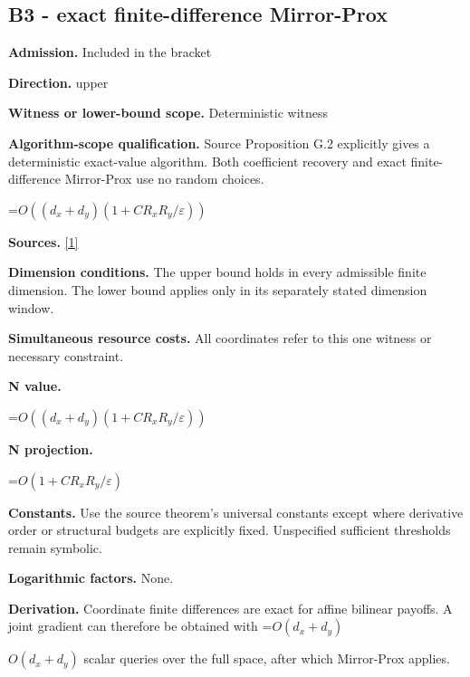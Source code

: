 \documentclass[10pt,a4paper]{article}
\newcommand{\AtlasMath}[1]{\par\begingroup\centering\setbox0=\hbox{$\displaystyle #1$}\ifdim\wd0>1.4\linewidth\typeout{ATLAS WIDE FORMULA: \the\wd0}\fi\ifdim\wd0>\linewidth\resizebox{\linewidth}{!}{\box0}\else\box0\fi\par\endgroup}
\newcommand{\AtlasInlineMath}[1]{\begingroup\setbox0=\hbox{$#1$}\ifdim\wd0>.4\linewidth\endgroup\AtlasMath{#1}\else\endgroup$#1$\fi}
\begin{document}
\subsection{B3 - exact finite-difference Mirror-Prox}


\textbf{Admission.} Included in the bracket



\textbf{Direction.} upper



\textbf{Witness or lower-bound scope.} Deterministic witness



\textbf{Algorithm-scope qualification.} Source Proposition G.2 explicitly gives a deterministic exact-value algorithm. Both coefficient recovery and exact finite-difference Mirror-Prox use no random choices.



\AtlasMath{O((d_x+d_y)(1+CR_xR_y/\varepsilon))}


\textbf{Sources.} \href{https://arxiv.org/pdf/2610.00345v1}{[1]}



\textbf{Dimension conditions.} The upper bound holds in every admissible finite dimension. The lower bound applies only in its separately stated dimension window.



\textbf{Simultaneous resource costs.} All coordinates refer to this one witness or necessary constraint.



\textbf{N value.}



\AtlasMath{O((d_x+d_y)(1+CR_xR_y/\varepsilon))}


\textbf{N projection.}



\AtlasMath{O(1+CR_xR_y/\varepsilon)}


\textbf{Constants.} Use the source theorem’s universal constants except where derivative order or structural budgets are explicitly fixed. Unspecified sufficient thresholds remain symbolic.



\textbf{Logarithmic factors.} None.



\textbf{Derivation.} Coordinate finite differences are exact for affine bilinear payoffs. A joint gradient can therefore be obtained with \AtlasInlineMath{O(d_x+d_y)} scalar queries over the full space, after which Mirror-Prox applies.
\end{document}

